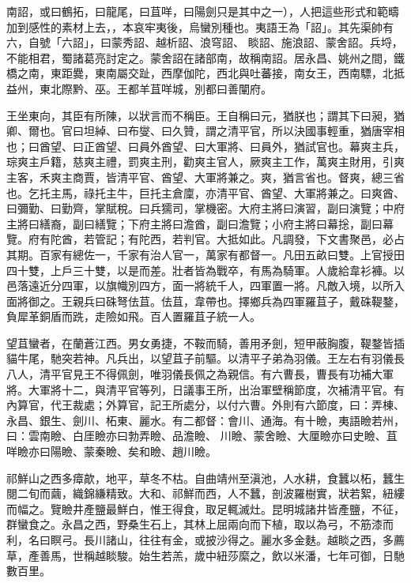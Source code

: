 
\begin{pinyinscope}
南詔，或曰鶴拓，曰龍尾，曰苴咩，曰陽劍只是其中之一），人把這些形式和範疇加到感性的素材上去，，本哀牢夷後，烏蠻別種也。夷語王為「詔」。其先渠帥有六，自號「六詔」，曰蒙秀詔、越析詔、浪穹詔、
 睒詔、施浪詔、蒙舍詔。兵埒，不能相君，蜀諸葛亮討定之。蒙舍詔在諸部南，故稱南詔。居永昌、姚州之間，鐵橋之南，東距爨，東南屬交趾，西摩伽陀，西北與吐蕃接，南女王，西南驃，北抵益州，東北際黔、巫。王都羊苴咩城，別都曰善闡府。



 王坐東向，其臣有所陳，以狀言而不稱臣。王自稱曰元，猶朕也；謂其下曰昶，猶卿、爾也。官曰坦綽、曰布燮、曰久贊，謂之清平官，所以決國事輕重，猶唐宰相也；曰酋望、曰正酋望、曰員外酋望、曰大軍將、曰員外，猶試官也。幕爽主兵，琮爽主戶籍，慈爽主禮，罰爽主刑，勸爽主官人，厥爽主工作，萬爽主財用，引爽主客，禾爽主商賈，皆清平官、酋望、大軍將兼之。爽，猶言省也。督爽，總三省也。乞托主馬，祿托主牛，巨托主倉廩，亦清平官、酋望、大軍將兼之。曰爽酋、曰彌勤、曰勤齊，掌賦稅。曰兵獳司，掌機密。大府主將曰演習，副曰演覽；中府主將曰繕裔，副曰繕覽；下府主將曰澹酋，副曰澹覽；小府主將曰幕捴，副曰幕覽。府有陀酋，若管記；有陀西，若判官。大抵如此。凡調發，下文書聚邑，必占其期。百家有總佐一，千家有治人官一，萬家有都督一。凡田五畝曰雙。上官授田四十雙，上戶三十雙，以是而差。壯者皆為戰卒，有馬為騎軍。人歲給韋衫褲。以邑落遠近分四軍，以旗幟別四方，面一將統千人，四軍置一將。凡敵入境，以所入面將御之。王親兵曰硃弩佉苴。佉苴，韋帶也。擇鄉兵為四軍羅苴子，戴硃鞮鍪，負犀革銅盾而跣，走險如飛。百人置羅苴子統一人。


望苴蠻者，在蘭蒼江西。男女勇捷，不鞍而騎，善用矛劍，短甲蔽胸腹，鞮鍪皆插貓牛尾，馳突若神。凡兵出，以望苴子前驅。以清平子弟為羽儀。王左右有羽儀長八人，清平官見王不得佩劍，唯羽儀長佩之為親信。有六曹長，曹長有功補大軍將。大軍將十二，與清平官等列，日議事王所，出治軍壁稱節度，次補清平官。有內算官，代王裁處；外算官，記王所處分，以付六曹。外則有六節度，曰：弄棟、永昌、銀生、劍川、柘東、麗水。有二都督：會川、通海。有十瞼，夷語瞼若州，曰：雲南瞼、白厓瞼亦曰勃弄瞼、品澹瞼、
 川瞼、蒙舍瞼、大厘瞼亦曰史瞼、苴咩瞼亦曰陽瞼、蒙秦瞼、矣和瞼、趙川瞼。



 祁鮮山之西多瘴歊，地平，草冬不枯。自曲靖州至滇池，人水耕，食蠶以柘，蠶生閱二旬而繭，織錦縑精致。大和、祁鮮而西，人不蠶，剖波羅樹實，狀若絮，紐縷而幅之。覽瞼井產鹽最鮮白，惟王得食，取足輒滅灶。昆明城諸井皆產鹽，不征，群蠻食之。永昌之西，野桑生石上，其林上屈兩向而下植，取以為弓，不筋漆而利，名曰瞑弓。長川諸山，往往有金，或披沙得之。麗水多金麩。越睒之西，多薦草，產善馬，世稱越睒駿。始生若羔，歲中紐莎縻之，飲以米潘，七年可御，日馳數百里。




\end{pinyinscope}
